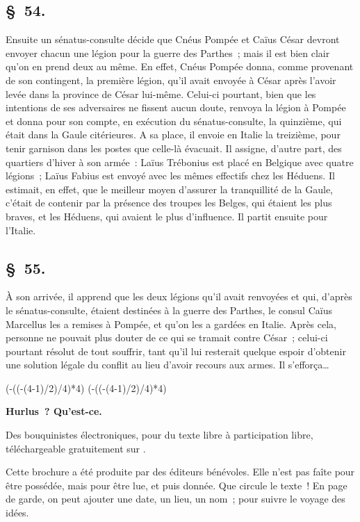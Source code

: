 \documentclass[french,twoside]{book} %
\def\truncdiv#1#2{((#1-(#2-1)/2)/#2)}
\def\moduloop#1#2{(#1-\truncdiv{#1}{#2}*#2)}
\def\modulo#1#2{\number\numexpr\moduloop{#1}{#2}\relax}
\begin{document}
\subsection[{§ 54.}]{ \textsc{§ 54.} }
\noindent Ensuite un sénatus-consulte décide que Cnéus Pompée et Caïus César devront envoyer chacun une légion pour la guerre des Parthes ; mais il est bien clair qu’on en prend deux au même. En effet, Cnéus Pompée donna, comme provenant de son contingent, la première légion, qu’il avait envoyée à César après l’avoir levée dans la province de César lui-même. Celui-ci pourtant, bien que les intentions de ses adversaires ne fissent aucun doute, renvoya la légion à Pompée et donna pour son compte, en exécution du sénatus-consulte, la quinzième, qui était dans la Gaule citérieures. A sa place, il envoie en Italie la treizième, pour tenir garnison dans les postes que celle-là évacuait. Il assigne, d’autre part, des quartiers d’hiver à son armée : Laïus Trébonius est placé en Belgique avec quatre légions ; Laïus Fabius est envoyé avec les mêmes effectifs chez les Héduens. Il estimait, en effet, que le meilleur moyen d’assurer la tranquillité de la Gaule, c’était de contenir par la présence des troupes les Belges, qui étaient les plus braves, et les Héduens, qui avaient le plus d’influence. Il partit ensuite pour l’Italie.
\subsection[{§ 55.}]{ \textsc{§ 55.} }
\noindent À son arrivée, il apprend que les deux légions qu’il avait renvoyées et qui, d’après le sénatus-consulte, étaient destinées à la guerre des Parthes, le consul Caïus Marcellus les a remises à Pompée, et qu’on les a gardées en Italie. Après cela, personne ne pouvait plus douter de ce qui se tramait contre César ; celui-ci pourtant résolut de tout souffrir, tant qu’il lui resterait quelque espoir d’obtenir une solution légale du conflit au lieu d’avoir recours aux armes. Il s’efforça…
 


\ifbooklet
  \pagestyle{empty}
  \clearpage
  \ifnum\modulo{\value{page}}{4}=0 \hbox{}\newpage\hbox{}\newpage\fi
  \ifnum\modulo{\value{page}}{4}=1 \hbox{}\newpage\hbox{}\newpage\fi


  \hbox{}\newpage
  \ifodd\value{page}\hbox{}\newpage\fi
  {\centering\color{rubric}\bfseries\noindent\large
    Hurlus ? Qu’est-ce.\par
    \bigskip
  }
  \noindent Des bouquinistes électroniques, pour du texte libre à participation libre,
  téléchargeable gratuitement sur \href{https://hurlus.fr}{}.\par
  \bigskip
  \noindent Cette brochure a été produite par des éditeurs bénévoles.
  Elle n’est pas faîte pour être possédée, mais pour être lue, et puis donnée.
  Que circule le texte !
  En page de garde, on peut ajouter une date, un lieu, un nom ; pour suivre le voyage des idées.
  \par
\end{document}
